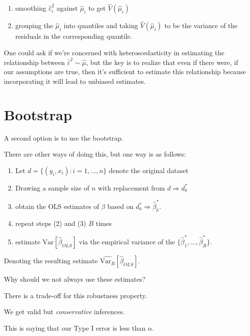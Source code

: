 \documentclass[
  letterpaper,
  DIV=11,
  numbers=noendperiod]{scrreport}
\providecommand{\tightlist}{%
  \setlength{\itemsep}{0pt}\setlength{\parskip}{0pt}}\usepackage{longtable,booktabs,array}
\begin{document}
\begin{enumerate}
\def\labelenumi{\arabic{enumi}.}
\tightlist
\item
  smoothing \(\hat \varepsilon_i^2\) against \(\hat \mu_i\) to get
  \(\hat V(\hat \mu_i)\)
\item
  grouping the \(\hat \mu_i\) into quantiles and taking
  \(\hat V(\hat \mu_i)\) to be the variance of the residuals in the
  corresponding quantile.
\end{enumerate}

One could ask if we're concerned with heteroscedasticity in estimating
the relationship between \(\hat \varepsilon^2 \sim \hat \mu\), but the
key is to realize that even if there were, if our assumptions are true,
then it's sufficient to estimate this relationship because incorporating
it will lead to unbiased estimates.

\hypertarget{bootstrap-2}{%
\section{Bootstrap}\label{bootstrap-2}}

A second option is to use the bootstrap.

There are other ways of doing this, but one way is as follows:

\begin{enumerate}
\def\labelenumi{\arabic{enumi}.}
\tightlist
\item
  Let \(d = \{ (y_i, x_i) : i = 1, ..., n \}\) denote the original
  dataset
\item
  Drawing a sample size of \(n\) with replacement from
  \(d \Rightarrow d_b^*\)
\item
  obtain the OLS estimates of \(\beta\) based on
  \(d_b^* \Rightarrow \hat \beta_b^*\).
\item
  repeat steps (2) and (3) \(B\) times
\item
  estimate \(\text{Var}[\hat \beta_{OLS}]\) via the empirical variance
  of the \(\{ \hat \beta_1^*, ..., \hat \beta_B^*\}\).
\end{enumerate}

Denoting the resulting estimate
\(\widehat{\text{Var}_B}[\hat \beta_{OLS}]\).

Why should we not always use these estimates?

There is a trade-off for this robustness property.

We get valid but \emph{conservative} inferences.

This is saying that our Type I error is less than \(\alpha\).
\end{document}
